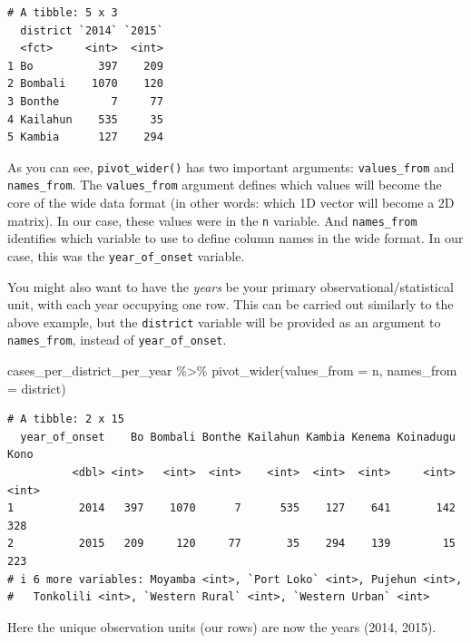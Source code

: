 \documentclass[
  letterpaper,
  DIV=11,
  numbers=noendperiod]{scrreprt}
\newenvironment{Shaded}{\begin{snugshade}}{\end{snugshade}}
\newcommand{\AttributeTok}[1]{\textcolor[rgb]{0.40,0.45,0.13}{#1}}
\newcommand{\FunctionTok}[1]{\textcolor[rgb]{0.28,0.35,0.67}{#1}}
\newcommand{\NormalTok}[1]{\textcolor[rgb]{0.00,0.23,0.31}{#1}}
\newcommand{\SpecialCharTok}[1]{\textcolor[rgb]{0.37,0.37,0.37}{#1}}
\begin{document}
\begin{verbatim}
# A tibble: 5 x 3
  district `2014` `2015`
  <fct>     <int>  <int>
1 Bo          397    209
2 Bombali    1070    120
3 Bonthe        7     77
4 Kailahun    535     35
5 Kambia      127    294
\end{verbatim}

As you can see, \texttt{pivot\_wider()} has two important arguments:
\texttt{values\_from} and \texttt{names\_from}. The
\texttt{values\_from} argument defines which values will become the core
of the wide data format (in other words: which 1D vector will become a
2D matrix). In our case, these values were in the \texttt{n} variable.
And \texttt{names\_from} identifies which variable to use to define
column names in the wide format. In our case, this was the
\texttt{year\_of\_onset} variable.

\begin{tcolorbox}[enhanced jigsaw, title=\textcolor{quarto-callout-note-color}{\faInfo}\hspace{0.5em}{Side Note}, colbacktitle=quarto-callout-note-color!10!white, leftrule=.75mm, arc=.35mm, opacityback=0, bottomrule=.15mm, rightrule=.15mm, toptitle=1mm, breakable, toprule=.15mm, colback=white, coltitle=black, colframe=quarto-callout-note-color-frame, bottomtitle=1mm, titlerule=0mm, left=2mm, opacitybacktitle=0.6]

You might also want to have the \emph{years} be your primary
observational/statistical unit, with each year occupying one row. This
can be carried out similarly to the above example, but the
\texttt{district} variable will be provided as an argument to
\texttt{names\_from}, instead of \texttt{year\_of\_onset}.

\begin{Shaded}
\begin{Highlighting}[]
\NormalTok{cases\_per\_district\_per\_year }\SpecialCharTok{\%\textgreater{}\%} 
  \FunctionTok{pivot\_wider}\NormalTok{(}\AttributeTok{values\_from =}\NormalTok{ n, }
              \AttributeTok{names\_from =}\NormalTok{ district)}
\end{Highlighting}
\end{Shaded}

\begin{verbatim}
# A tibble: 2 x 15
  year_of_onset    Bo Bombali Bonthe Kailahun Kambia Kenema Koinadugu  Kono
          <dbl> <int>   <int>  <int>    <int>  <int>  <int>     <int> <int>
1          2014   397    1070      7      535    127    641       142   328
2          2015   209     120     77       35    294    139        15   223
# i 6 more variables: Moyamba <int>, `Port Loko` <int>, Pujehun <int>,
#   Tonkolili <int>, `Western Rural` <int>, `Western Urban` <int>
\end{verbatim}

Here the unique observation units (our rows) are now the years (2014,
2015).

\end{tcolorbox}
\end{document}
